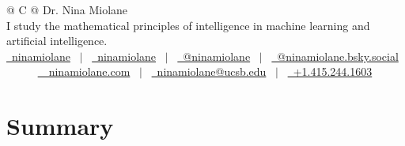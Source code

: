 \documentclass[a4paper,12pt]{article}
\begin{document}
\pagestyle{empty} 

\begin{tabularx}{\linewidth}{@{} C @{}}
\huge{Dr. Nina Miolane} \\[7.5pt]
I study the mathematical principles of intelligence in machine learning and artificial intelligence.\\[7.5pt]
\href{https://github.com/ninamiolane}{\raisebox{-0.05\height}\faGithub\ ninamiolane} \ $|$ \ 
\href{https://linkedin.com/in/ninamiolane}{\raisebox{-0.05\height}\faLinkedin\ ninamiolane} \ $|$ \ 
\href{https://x.com/ninamiolane}{\raisebox{-0.05\height}\faTwitter\ @ninamiolane} \ $|$ \
\href{https://bsky.app/profile/ninamiolane.bsky.social}{\raisebox{-0.05\height}\faGlobe\ @ninamiolane.bsky.social} \ ~~~ \
\href{https://ninamiolane.com}{\raisebox{-0.05\height}\faGlobe~\ ninamiolane.com} \ $|$ \ 
\href{mailto:ninamiolane@ucsb.edu}{\raisebox{-0.05\height}\faEnvelope \ ninamiolane@ucsb.edu} \ $|$ \ 
\href{tel:+1452441603}{\raisebox{-0.05\height}\faMobile \ +1.415.244.1603} \\
\end{tabularx}


\section{Summary}
\end{document}
